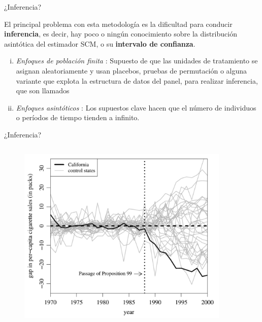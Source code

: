 \documentclass[8pt]{beamer}
\begin{document}
\begin{frame}{¿Inferencia?}
    
El principal problema con esta metodología es la dificultad para conducir \textbf{inferencia}, es decir, hay poco o ningún conocimiento sobre la distribución asintótica del estimador SCM, o su \textbf{intervalo de confianza}.\\



\begin{enumerate} [(i)]

    \item \emph{Enfoques de población finita} : Supuesto de que las unidades de tratamiento se asignan aleatoriamente y usan placebos, pruebas de permutación o alguna variante que explota la estructura de datos del panel, para realizar inferencia, que son llamados \\
    
    
    \item \emph{Enfoques asintóticos} : Los supuestos clave hacen que el número de individuos o períodos de tiempo tienden a infinito.
\end{enumerate}
\end{frame}

\begin{frame}{¿Inferencia?}
    
\begin{columns}

\begin{column}{0.5\textwidth}
\begin{figure}[H]
    \begin{center}
        \includegraphics[width=0.95\textwidth]{Figuras/sc_adh.pdf}
        \end{center}
\end{figure}
\end{column}

\begin{column}{0.5\textwidth}

\end{column}

\end{columns}
\end{frame}
\end{document}
